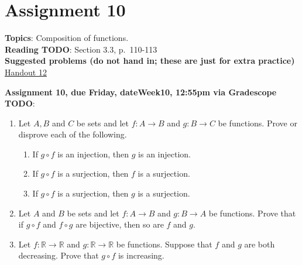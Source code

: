 \documentclass[12pt]{article}
\newcommand{\HWdueTime}{12:55pm }
\newcommand{\R}{{\mathbb R}}
\begin{document}
\newpage
\section[10 (due \csname dateWeek10\endcsname): Composition of functions.]{Assignment 10}

\textbf{Topics}: Composition of functions.
\\

\noindent \textbf{Reading TODO}: Section 3.3, p.~110-113
\\


\noindent \textbf{Suggested problems (do not hand in; these are just for extra practice)} \href{https://www.math.emory.edu/~dzb/teaching/250Fall2021/handouts/250-H12-compositions.pdf}{Handout 12}

\noindent \textbf{Assignment 10, due Friday, \csname dateWeek10\endcsname, \HWdueTime via Gradescope TODO}:
\begin{enumerate}
\item Let $A, B$ and $C$ be sets and let $f \colon A \to B$ and $g \colon B \to C$ be functions. Prove or disprove each of the following.
 \begin{enumerate}
 \item If $g\circ f$ is an injection, then $g$ is an injection.
 \item If $g\circ f$ is a surjection, then $f$ is a surjection.
 \item If $g\circ f$ is a surjection, then $g$ is a surjection.
 \end{enumerate}
\item Let $A$ and $B$ be sets and let $f \colon A \to B$ and $g \colon B \to A$ be functions. Prove that if $g \circ f$ and $f \circ g$ are bijective, then so are $f$ and $g$.

 \item Let $f \colon \R \to \R$ and $g \colon \R \to \R$ be functions. Suppose that $f$ and $g$ are both decreasing. Prove that $g \circ f$ is increasing.
 \end{enumerate}



\newpage
\end{document}
